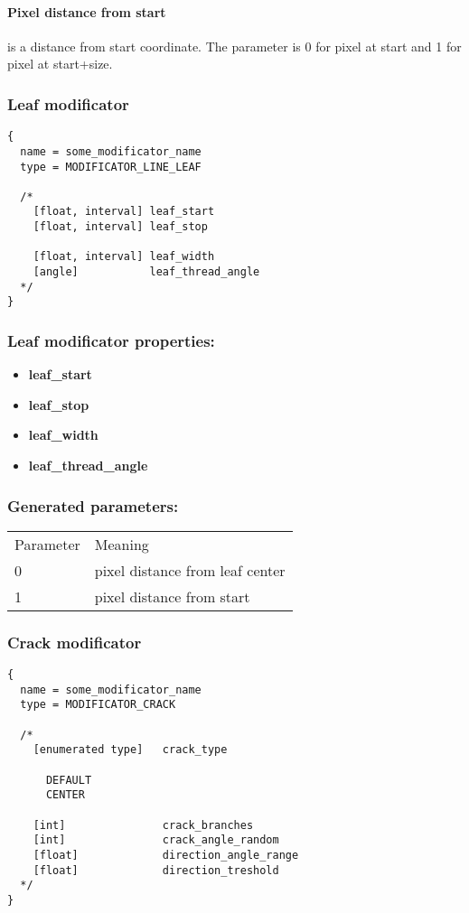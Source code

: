 \documentclass[9pt]{article}
\begin{document}
\paragraph*{Pixel distance from start} is a distance from start coordinate. 
The parameter is 0 for pixel at start and 1 for pixel at start+size.

\subsubsection{Leaf modificator}

\begin{verbatim}
{
  name = some_modificator_name
  type = MODIFICATOR_LINE_LEAF

  /*
    [float, interval] leaf_start
    [float, interval] leaf_stop
  
    [float, interval] leaf_width
    [angle]           leaf_thread_angle
  */
}
\end{verbatim}
\subsubsection*{Leaf modificator properties:}
\begin{itemize}
\item{\bf leaf\_start}
\item{\bf leaf\_stop}
\item{\bf leaf\_width}
\item{\bf leaf\_thread\_angle}
\end{itemize}

\subsubsection*{Generated parameters:}

\begin{tabular}{|l||l|}
  Parameter & Meaning \\
  0 & pixel distance from leaf center \\
  1 & pixel distance from start \\  
\end{tabular}

\subsubsection{Crack modificator}

\begin{verbatim}
{
  name = some_modificator_name
  type = MODIFICATOR_CRACK

  /*
    [enumerated type]   crack_type
    
      DEFAULT
      CENTER

    [int]               crack_branches
    [int]               crack_angle_random
    [float]             direction_angle_range
    [float]             direction_treshold
  */
}
\end{verbatim}
\end{document}
